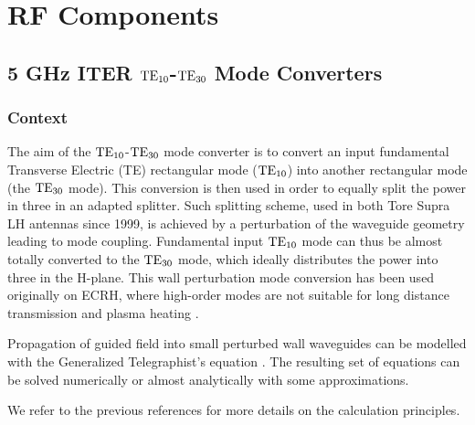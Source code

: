 \section{RF Components}\label{sec:RF_components}

\subsection{5 GHz ITER ${\mathrm{TE}}_{10}$-${\mathrm{TE}}_{30}$ Mode Converters}\label{sec:mode_converter}

\subsubsection{Context}
The aim of the ${\mathrm{TE}}_{10}$-${\mathrm{TE}}_{30}$ mode converter is to convert an input fundamental Transverse Electric (TE) rectangular mode (${\mathrm{TE}}_{10}$) into another rectangular mode (the ${\mathrm{TE}}_{30}$ mode). This conversion is then used in order to equally split the power in three in an adapted splitter. Such splitting scheme, used in both Tore Supra LH antennas since 1999, is achieved by a perturbation of the waveguide geometry leading to mode coupling. Fundamental input ${\mathrm{TE}}_{10}$ mode can thus be almost totally converted to the ${\mathrm{TE}}_{30}$ mode, which ideally distributes the power into three in the H-plane. This wall perturbation mode conversion has been used originally on ECRH, where high-order modes are not suitable for long distance transmission and plasma heating \cite{thumm1987-1, thumm2002}. 

Propagation of guided field into small perturbed wall waveguides can be modelled with the Generalized Telegraphist's equation . The resulting set of equations can be solved numerically  or almost analytically with some approximations\cite{unger1958, solymar1959}. 

We refer to the previous references for more details on the calculation principles. 

